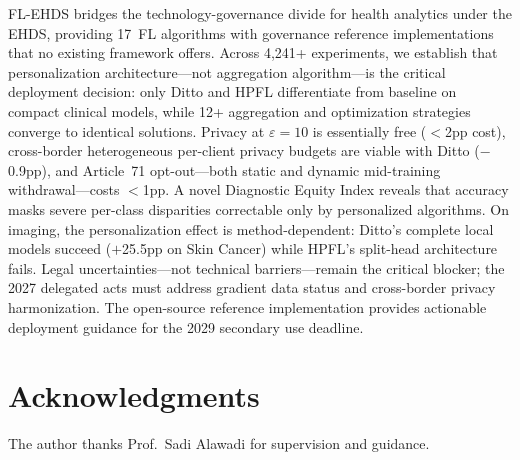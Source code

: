 \documentclass[conference,letterpaper]{IEEEtran}
\begin{document}
FL-EHDS bridges the technology-governance divide for health analytics under the EHDS, providing 17~FL algorithms with governance reference implementations that no existing framework offers. Across 4,241+ experiments, we establish that personalization architecture---not aggregation algorithm---is the critical deployment decision: only Ditto and HPFL differentiate from baseline on compact clinical models, while 12+ aggregation and optimization strategies converge to identical solutions. Privacy at $\varepsilon{=}10$ is essentially free ($<$2pp cost), cross-border heterogeneous per-client privacy budgets are viable with Ditto ($-$0.9pp), and Article~71 opt-out---both static and dynamic mid-training withdrawal---costs $<$1pp. A novel Diagnostic Equity Index reveals that accuracy masks severe per-class disparities correctable only by personalized algorithms. On imaging, the personalization effect is method-dependent: Ditto's complete local models succeed ($+$25.5pp on Skin Cancer) while HPFL's split-head architecture fails. Legal uncertainties---not technical barriers---remain the critical blocker; the 2027 delegated acts must address gradient data status and cross-border privacy harmonization. The open-source reference implementation provides actionable deployment guidance for the 2029 secondary use deadline.

\section*{Acknowledgments}
The author thanks Prof.~Sadi Alawadi for supervision and guidance.


\end{document}
